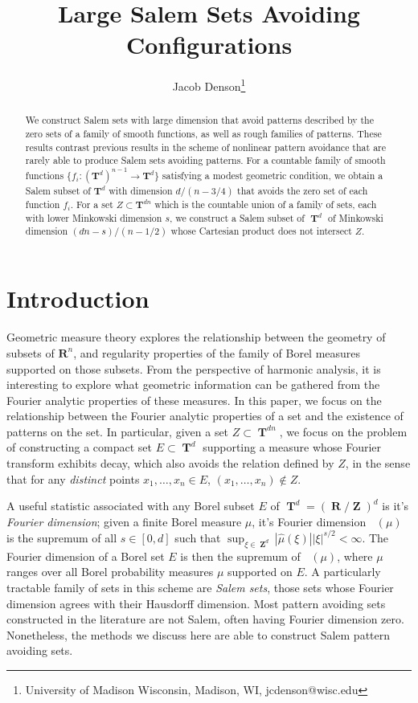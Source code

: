 \documentclass[dvipsnames,letterpaper,12pt]{article}
\title{Large Salem Sets Avoiding Configurations}
\author{Jacob Denson\footnote{University of Madison Wisconsin, Madison, WI, jcdenson@wisc.edu}}
\numberwithin{equation}{section}
\DeclareMathOperator{\fordim}{\dim_{\mathbf{F}}}
\DeclareMathOperator{\RR}{\mathbf{R}}
\DeclareMathOperator{\ZZ}{\mathbf{Z}}
\DeclareMathOperator{\TT}{\mathbf{T}}
\numberwithin{theorem}{section}
\begin{document}
\maketitle

\begin{abstract}
    We construct Salem sets with large dimension that avoid patterns described by the zero sets of a family of smooth functions, as well as rough families of patterns. These results contrast previous results in the scheme of nonlinear pattern avoidance that are rarely able to produce Salem sets avoiding patterns. For a countable family of smooth functions $\{ f_i : (\mathbf{T}^d)^{n-1} \to \mathbf{T}^d \}$ satisfying a modest geometric condition, we obtain a Salem subset of $\mathbf{T}^d$ with dimension $d/(n-3/4)$ that avoids the zero set of each function $f_i$. For a set $Z \subset \mathbf{T}^{dn}$ which is the countable union of a family of sets, each with lower Minkowski dimension $s$, we construct a Salem subset of $\TT^d$ of Minkowski dimension $(dn - s)/(n - 1/2)$ whose Cartesian product does not intersect $Z$.
\end{abstract}

\section{Introduction}

Geometric measure theory explores the relationship between the geometry of subsets of $\mathbf{R}^n$, and regularity properties of the family of Borel measures supported on those subsets. From the perspective of harmonic analysis, it is interesting to explore what geometric information can be gathered from the Fourier analytic properties of these measures. In this paper, we focus on the relationship between the Fourier analytic properties of a set and the existence of patterns on the set. In particular, given a set $Z \subset \TT^{dn}$, we focus on the problem of constructing a compact set $E \subset \TT^d$ supporting a measure whose Fourier transform exhibits decay, which also avoids the relation defined by $Z$, in the sense that for any \emph{distinct} points $x_1,\dots,x_n \in E$, $(x_1,\dots,x_n) \not \in Z$.


A useful statistic associated with any Borel subset $E$ of $\TT^d = (\RR/\ZZ)^d$ is it's \emph{Fourier dimension}; given a finite Borel measure $\mu$, it's Fourier dimension $\fordim(\mu)$ is the supremum of all $s \in [0,d]$ such that $\sup_{\xi \in \ZZ^d} |\widehat{\mu}(\xi)| |\xi|^{s/2} < \infty$. The Fourier dimension of a Borel set $E$ is then the supremum of $\fordim(\mu)$, where $\mu$ ranges over all Borel probability measures $\mu$ supported on $E$. A particularly tractable family of sets in this scheme are \emph{Salem sets}, those sets whose Fourier dimension agrees with their Hausdorff dimension. Most pattern avoiding sets constructed in the literature are not Salem, often having Fourier dimension zero. Nonetheless, the methods we discuss here are able to construct Salem pattern avoiding sets.
\end{document}
